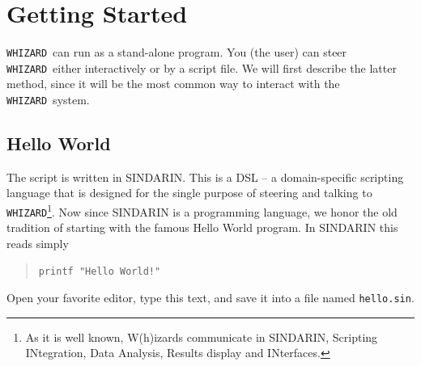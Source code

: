 \documentclass[12pt]{book}
\newcommand{\whizard}{\texttt{WHIZARD}}
\begin{document}

\clearpage

\chapter{Getting Started}
\label{chap:start}

\whizard\ can run as a stand-alone program.  You (the user) can steer
\whizard\ either interactively or by a script file.  We will first
describe the latter method, since it will be the most common way to
interact with the \whizard\ system.

\section{Hello World}

The script is written in SINDARIN.  This is a DSL -- a domain-specific
scripting language that is designed for the single purpose of steering and
talking to \whizard\footnote{As it is well known, W(h)izards communicate in
  SINDARIN, Scripting INtegration, Data Analysis, Results display and
  INterfaces.}.  Now since SINDARIN is a programming language, we honor the old
tradition of starting with the famous Hello World program.  In SINDARIN this
reads simply


\begin{quote}
\begin{verbatim}
printf "Hello World!"
\end{verbatim}
\end{quote}
Open your favorite editor, type this text, and save it into a file
named \verb|hello.sin|.
\end{document}
